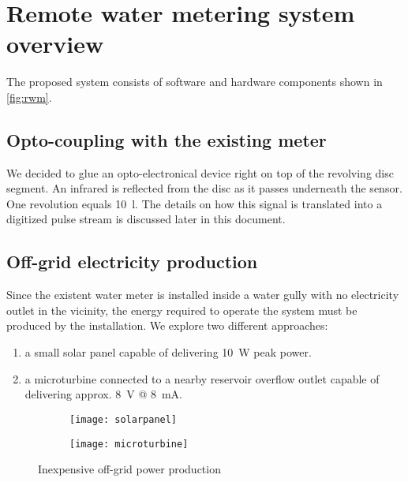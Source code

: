 \chapter{Remote water metering system overview}

The proposed system consists of software and hardware components shown in \ref{fig:rwm}.


\section{Opto-coupling with the existing meter}

We decided to glue an opto-electronical device right on top of the revolving disc segment.
An infrared is reflected from the disc as it passes underneath the sensor. One revolution equals \SI{10}{\litre}. The details on how
this signal is translated into a digitized pulse stream is discussed later in this document.

\section{Off-grid electricity production}

Since the existent water meter is installed inside a water gully with no electricity outlet in the vicinity,
the energy required to operate the system must be produced by the installation.
We explore two different approaches:
\begin{enumerate}
    \item a small solar panel capable of delivering \SI{10}{\watt} peak power.
    \item a microturbine connected to a nearby  reservoir overflow outlet capable of delivering approx. \SI{8}{\volt} @ \SI{8}{\milli\ampere}.
\end{enumerate}


\begin{figure}[h]
    \centering
    \begin{subfigure}[b]{0.45\textwidth}
        \centering
        \texttt{[image: solarpanel]}
        \label{fig:sp}
    \end{subfigure}
    \hfill
    \begin{subfigure}[b]{0.45\textwidth}
        \centering
        \texttt{[image: microturbine]}
        \label{fig:mt}
    \end{subfigure}
    \caption{Inexpensive off-grid power production}
    \label{fig:ewm}
\end{figure}

